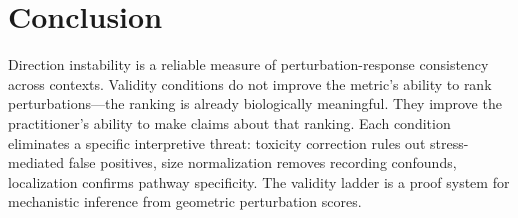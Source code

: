 \documentclass{article}
\begin{document}
\section{Conclusion}

Direction instability is a reliable measure of perturbation-response
consistency across contexts. Validity conditions do not improve the metric's
ability to rank perturbations---the ranking is already biologically meaningful.
They improve the practitioner's ability to make claims about that ranking.
Each condition eliminates a specific interpretive threat: toxicity correction
rules out stress-mediated false positives, size normalization removes recording
confounds, localization confirms pathway specificity. The validity ladder is a
proof system for mechanistic inference from geometric perturbation scores.



\end{document}
